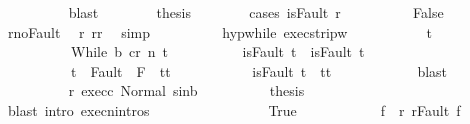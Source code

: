 \begin{isabellebody}
\ \ \ \ \ \ \ \ \isamarkupfalse%
\ blast\isanewline
\ \ \ \ \ \ \isamarkupfalse%
\ {\isacharquery}thesis\isanewline
\ \ \ \ \ \ \isamarkupfalse%
\ {\isacharparenleft}cases\ {\isachardoublequoteopen}isFault\ r{\isacharprime}{\isachardoublequoteclose}{\isacharparenright}\isanewline
\ \ \ \ \ \ \ \ \isamarkupfalse%
\ False\isanewline
\ \ \ \ \ \ \ \ \isamarkupfalse%
\ r{\isacharprime}{\isacharunderscore}noFault\ \isamarkupfalse%
\ r{\isacharprime}{\isacharcolon}\ {\isachardoublequoteopen}r{\isacharprime}{\isacharequal}r{\isachardoublequoteclose}\ \isamarkupfalse%
\ simp\isanewline
\ \ \ \ \ \ \ \ \isamarkupfalse%
\ hyp{\isacharunderscore}while\ exec{\isacharunderscore}strip{\isacharunderscore}w\ \isanewline
\ \ \ \ \ \ \ \ \isamarkupfalse%
\ t{\isacharprime}\ \isanewline
\ \ \ \ \ \ \ \ \ \ {\isachardoublequoteopen}{\isasymGamma}{\isasymturnstile}{\isasymlangle}While\ b\ c{\isacharcomma}r{\isasymrangle}\ {\isacharequal}n{\isasymRightarrow}\ t{\isacharprime}{\isachardoublequoteclose}\isanewline
\ \ \ \ \ \ \ \ \ \ {\isachardoublequoteopen}isFault\ t\ {\isasymlongrightarrow}\ isFault\ t{\isacharprime}{\isachardoublequoteclose}\isanewline
\ \ \ \ \ \ \ \ \ \ {\isachardoublequoteopen}t{\isacharprime}\ {\isasymin}\ Fault\ {\isacharbackquote}\ {\isacharparenleft}{\isacharminus}F{\isacharparenright}\ {\isasymlongrightarrow}\ t{\isacharprime}{\isacharequal}t{\isachardoublequoteclose}\isanewline
\ \ \ \ \ \ \ \ \ \ {\isachardoublequoteopen}{\isasymnot}\ isFault\ t{\isacharprime}\ {\isasymlongrightarrow}\ t{\isacharprime}{\isacharequal}t{\isachardoublequoteclose}\isanewline
\ \ \ \ \ \ \ \ \ \ \isamarkupfalse%
\ blast\isanewline
\ \ \ \ \ \ \ \ \isamarkupfalse%
\ r{\isacharprime}\ exec{\isacharunderscore}c\ Normal\ s{\isacharprime}{\isacharunderscore}in{\isacharunderscore}b\isanewline
\ \ \ \ \ \ \ \ \isamarkupfalse%
\ {\isacharquery}thesis\isanewline
\ \ \ \ \ \ \ \ \ \ \isamarkupfalse%
\ {\isacharparenleft}blast\ intro{\isacharcolon}\ execn{\isachardot}intros{\isacharparenright}\isanewline
\ \ \ \ \ \ \isamarkupfalse%
\isanewline
\ \ \ \ \ \ \ \ \isamarkupfalse%
\ True\isanewline
\ \ \ \ \ \ \ \ \isamarkupfalse%
\ \isamarkupfalse%
\ f{\isacharprime}\ \ r{\isacharprime}{\isacharcolon}\ {\isachardoublequoteopen}r{\isacharprime}{\isacharequal}Fault\ f{\isacharprime}{\isachardoublequoteclose}\isacommand{{\isachardot}{\isachardot}}\isamarkupfalse%

\end{isabellebody}

